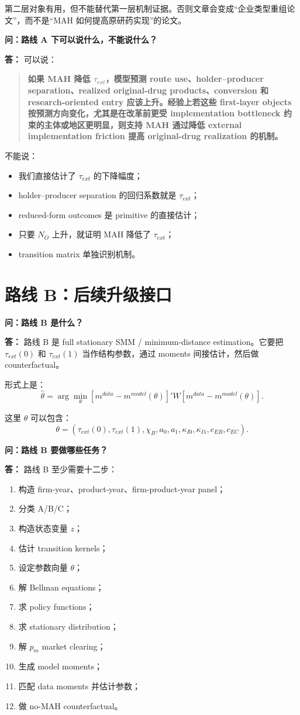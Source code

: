 \documentclass[10pt]{ctexart}
\newcommand{\qtitle}[1]{\vspace{0.35em}\noindent\textbf{问：#1}\par\vspace{0.15em}\noindent\textbf{答：}}
\newcommand{\key}[1]{\textbf{#1}}
\begin{document}
第二层对象有用，但不能替代第一层机制证据。否则文章会变成“企业类型重组论文”，而不是“MAH 如何提高原研药实现”的论文。

\qtitle{路线 A 下可以说什么，不能说什么？}
可以说：
\begin{quote}
\key{如果 MAH 降低 \(\tau_{ext}\)，模型预测 route use、holder--producer separation、realized original-drug products、conversion 和 research-oriented entry 应该上升。经验上若这些 first-layer objects 按预测方向变化，尤其是在改革前更受 implementation bottleneck 约束的主体或地区更明显，则支持 MAH 通过降低 external implementation friction 提高 original-drug realization 的机制。}
\end{quote}

不能说：
\begin{itemize}
    \item 我们直接估计了 \(\tau_{ext}\) 的下降幅度；
    \item holder--producer separation 的回归系数就是 \(\tau_{ext}\)；
    \item reduced-form outcomes 是 primitive 的直接估计；
    \item 只要 \(N_O\) 上升，就证明 MAH 降低了 \(\tau_{ext}\)；
    \item transition matrix 单独识别机制。
\end{itemize}

\section{路线 B：后续升级接口}

\qtitle{路线 B 是什么？}
路线 B 是 full stationary SMM / minimum-distance estimation。它要把 \(\tau_{ext}(0)\) 和 \(\tau_{ext}(1)\) 当作结构参数，通过 moments 间接估计，然后做 counterfactual。

形式上是：
\[
\hat{\theta}=\arg\min_{\theta}
[m^{data}-m^{model}(\theta)]'W[m^{data}-m^{model}(\theta)].
\]

这里 \(\theta\) 可以包含：
\[
\theta=(\tau_{ext}(0),\tau_{ext}(1),\chi_B,a_0,a_1,\kappa_{I0},\kappa_{I1},c_{EB},c_{EC}).
\]

\qtitle{路线 B 要做哪些任务？}
路线 B 至少需要十二步：
\begin{enumerate}
    \item 构造 firm-year、product-year、firm-product-year panel；
    \item 分类 A/B/C；
    \item 构造状态变量 \(z\)；
    \item 估计 transition kernels；
    \item 设定参数向量 \(\theta\)；
    \item 解 Bellman equations；
    \item 求 policy functions；
    \item 求 stationary distribution；
    \item 解 \(p_m\) market clearing；
    \item 生成 model moments；
    \item 匹配 data moments 并估计参数；
    \item 做 no-MAH counterfactual。
\end{enumerate}
\end{document}
